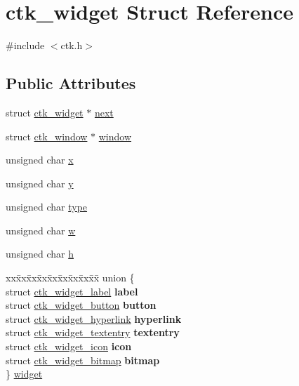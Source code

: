 \hypertarget{structctk__widget}{}\section{ctk\+\_\+widget Struct Reference}
\label{structctk__widget}


{\ttfamily \#include $<$ctk.\+h$>$}

\subsection*{Public Attributes}
\begin{DoxyCompactItemize}
\item 
struct \hyperlink{structctk__widget}{ctk\+\_\+widget} $\ast$ \hyperlink{structctk__widget_a3621ec9de98f2b90ec42cb2833d88423}{next}
\item 
struct \hyperlink{structctk__window}{ctk\+\_\+window} $\ast$ \hyperlink{structctk__widget_a07d184cf7dba0e5051b132da7f392490}{window}
\item 
unsigned char \hyperlink{structctk__widget_a58125a019e53600eae696dac334c6b82}{x}
\item 
unsigned char \hyperlink{structctk__widget_a64d6f0d7568e491e7f5cd0d38f40d1af}{y}
\item 
unsigned char \hyperlink{structctk__widget_a0313c4e5ca0a34104fc5514b6dd8d636}{type}
\item 
unsigned char \hyperlink{structctk__widget_ad28eb196d37bba6a60b48f4c7e6eb45e}{w}
\item 
unsigned char \hyperlink{structctk__widget_aceacf7e857117aff2c54a4c7c6441dac}{h}
\item 
\begin{tabbing}
xx\=xx\=xx\=xx\=xx\=xx\=xx\=xx\=xx\=\kill
union \{\\
\>struct \hyperlink{structctk__widget__label}{ctk\_widget\_label} {\bfseries label}\\
\>struct \hyperlink{structctk__widget__button}{ctk\_widget\_button} {\bfseries button}\\
\>struct \hyperlink{structctk__widget__hyperlink}{ctk\_widget\_hyperlink} {\bfseries hyperlink}\\
\>struct \hyperlink{structctk__widget__textentry}{ctk\_widget\_textentry} {\bfseries textentry}\\
\>struct \hyperlink{structctk__widget__icon}{ctk\_widget\_icon} {\bfseries icon}\\
\>struct \hyperlink{structctk__widget__bitmap}{ctk\_widget\_bitmap} {\bfseries bitmap}\\
\} \hyperlink{structctk__widget_afead36ab9579674197fdf985ccb82555}{widget}\\

\end{tabbing}\end{DoxyCompactItemize}


